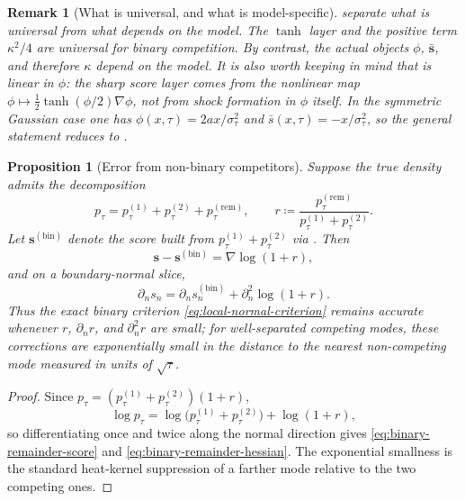 \documentclass[11pt]{article}
\newtheorem{proposition}[theorem]{Proposition}
\newtheorem{remark}[theorem]{Remark}
\begin{document}
\begin{remark}[What is universal, and what is model-specific]\label{rem:local-universal}
 separate what is universal from what depends on the model. The $\tanh$ layer and the positive term $\kappa^2/4$ are universal for binary competition. By contrast, the actual objects $\phi$, $\bar{\bm{s}}$, and therefore $\kappa$ depend on the model. It is also worth keeping in mind that  is linear in $\phi$: the sharp score layer comes from the nonlinear map $\phi\mapsto \tfrac{1}{2}\tanh(\phi/2)\nabla\phi$, not from shock formation in $\phi$ itself. In the symmetric Gaussian case one has $\phi(x,\tau)=2ax/\sigma_\tau^2$ and $\bar s(x,\tau)=-x/\sigma_\tau^2$, so the general statement reduces to .
\end{remark}

\begin{proposition}[Error from non-binary competitors]\label{prop:binary-remainder}
Suppose the true density admits the decomposition
\begin{equation}\label{eq:binary-remainder}
  p_\tau = p_\tau^{(1)} + p_\tau^{(2)} + p_\tau^{(\mathrm{rem})},
  \qquad
  r \coloneqq \frac{p_\tau^{(\mathrm{rem})}}{p_\tau^{(1)} + p_\tau^{(2)}}.
\end{equation}
Let $\bm{s}^{(\mathrm{bin})}$ denote the score built from $p_\tau^{(1)}+p_\tau^{(2)}$ via .
Then
\begin{equation}\label{eq:binary-remainder-score}
  \bm{s} - \bm{s}^{(\mathrm{bin})} = \nabla\log(1+r),
\end{equation}
and on a boundary-normal slice,
\begin{equation}\label{eq:binary-remainder-hessian}
  \partial_n s_n
  = \partial_n s_n^{(\mathrm{bin})} + \partial_n^2\log(1+r).
\end{equation}
Thus the exact binary criterion \eqref{eq:local-normal-criterion} remains accurate whenever $r$, $\partial_n r$, and $\partial_n^2 r$ are small; for well-separated competing modes, these corrections are exponentially small in the distance to the nearest non-competing mode measured in units of $\sqrt{\tau}$.
\end{proposition}

\begin{proof}
Since $p_\tau = (p_\tau^{(1)} + p_\tau^{(2)})(1+r)$,
\[
  \log p_\tau = \log\bigl(p_\tau^{(1)} + p_\tau^{(2)}\bigr) + \log(1+r),
\]
so differentiating once and twice along the normal direction gives \eqref{eq:binary-remainder-score} and \eqref{eq:binary-remainder-hessian}.
The exponential smallness is the standard heat-kernel suppression of a farther mode relative to the two competing ones.
\end{proof}
\end{document}
